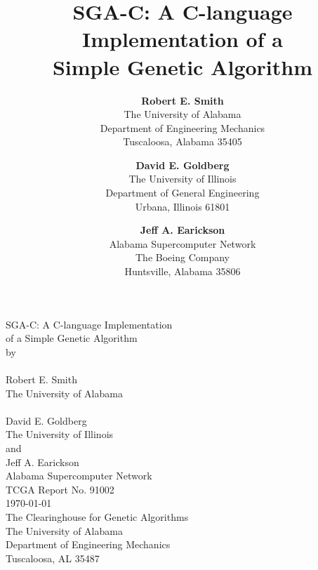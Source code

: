 \pagestyle{empty}

\oddsidemargin=-0.375in
\evensidemargin=-0.375in
\topmargin=-0.375in
\textheight=9.25in
\textwidth=7in
\footheight=0in
\columnsep=0.25in
\headsep=0in
\headheight=0in

\def\btt#1{\bf{\tt #1}}




\begin{titlepage}
\begin{center}
\vspace*{2.35in}
SGA-C: A C-language Implementation \\ 
of a Simple Genetic Algorithm
\ \\
by\\
\ \\
Robert E. Smith\\
The University of Alabama\\
\ \\ 
David E. Goldberg\\
The University of Illinois\\
and\\
Jeff A. Earickson\\
Alabama Supercomputer Network\\
\vspace{0.7in}
TCGA Report No. 91002\\
\today \\
\vspace{2.2in}
The Clearinghouse for Genetic Algorithms\\
The University of Alabama\\
Department of Engineering Mechanics\\
Tuscaloosa, AL 35487
\end{center}
\end{titlepage}


\title{SGA-C: A C-language Implementation of a\\ 
Simple Genetic Algorithm}
\author{{\bf Robert E. Smith}\\
The University of Alabama\\
Department of Engineering Mechanics\\
Tuscaloosa, Alabama 35405 
\and {\bf David E. Goldberg}\\
The University of Illinois\\
Department of General Engineering\\
Urbana, Illinois 61801
\and {\bf Jeff A. Earickson}\\
Alabama Supercomputer Network\\
The Boeing Company\\
Huntsville, Alabama 35806}
\maketitle

